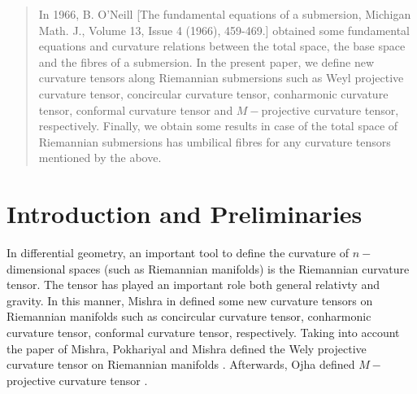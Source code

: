 \documentclass{birkjour}
\theoremstyle{definition}
\theoremstyle{remark}
\numberwithin{equation}{section}
\begin{document}




\date{January 1, 2004}

\begin{abstract}
In 1966, B. O'Neill [The fundamental equations of a submersion, Michigan Math. J., Volume 13, Issue 4 (1966), 459-469.] obtained some fundamental equations and curvature relations between the total space, the base space and the fibres of a submersion.  In the present paper, we define new curvature tensors  along Riemannian submersions such as Weyl projective curvature tensor, concircular curvature tensor, conharmonic curvature tensor, conformal curvature tensor and $M-$projective curvature tensor, respectively. Finally, we obtain some results in case of the total space of Riemannian submersions has umbilical fibres for any curvature tensors mentioned by the above. 
\end{abstract}




\maketitle

\section{Introduction and Preliminaries}


In differential geometry, an important tool to define the curvature of $n-$ dimensional spaces (such as Riemannian manifolds) is the Riemannian curvature tensor. The tensor has played an important role both general relativty and gravity. In this manner, Mishra in \cite{mishra}  defined some new curvature tensors on Riemannian manifolds such as concircular curvature tensor, conharmonic curvature tensor, conformal curvature tensor, respectively. Taking into account the paper of Mishra, Pokhariyal and Mishra defined the Wely projective curvature tensor on Riemannian manifolds \cite{PM}. Afterwards, Ojha defined $M-$ projective curvature tensor \cite{OJ}. 
\end{document}

